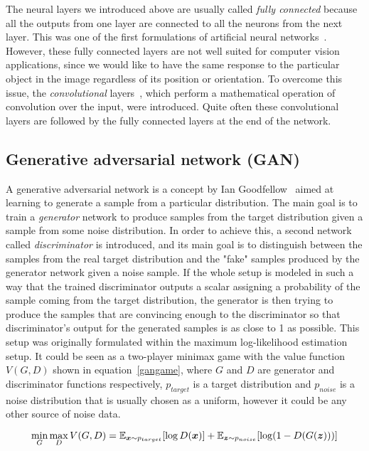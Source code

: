 The neural layers we introduced above are usually called {\em fully connected} because all the outputs from one layer are connected to all the neurons from the next layer. This was one of the first formulations of artificial neural networks~\cite{orignet}. However, these fully connected layers are not well suited for computer vision applications, since we would like to have the same response to the particular object in the image regardless of its position or orientation. To overcome this issue, the {\em convolutional} layers~\cite{convnet}, which perform a mathematical operation of convolution over the input, were introduced. Quite often these convolutional layers are followed by the fully connected layers at the end of the network.

\subsection{Generative adversarial network (GAN)}

A generative adversarial network is a concept by Ian Goodfellow~\cite{origgan} aimed at learning to generate a sample from a particular distribution. The main goal is to train a {\em generator} network to produce samples from the target distribution given a sample from some noise distribution. In order to achieve this, a second network called {\em discriminator} is introduced, and its main goal is to distinguish between the samples from the real target distribution and the "fake" samples produced by the generator network given a noise sample. If the whole setup is modeled in such a way that the trained discriminator outputs a scalar assigning a probability of the sample coming from the target distribution, the generator is then trying to produce the samples that are convincing enough to the discriminator so that discriminator's output for the generated samples is as close to 1 as possible. This setup was originally formulated within the maximum log-likelihood estimation setup. It could be seen as a two-player minimax game with the value function $V(G, D)$ shown in equation~\ref{gangame}, where $G$ and $D$ are generator and discriminator functions respectively, $p_{target}$ is a target distribution and $p_{noise}$ is a noise distribution that is usually chosen as a uniform, however it could be any other source of noise data.

\begin{equation}
\min_G \max_D V(G, D) = \operatorname{\mathbb{E}}_{\bm{x}\sim p_{target}}[\log D(\bm{x})] + \operatorname{\mathbb{E}}_{\bm{z}\sim p_{noise}} [\log(1 - D(G(\bm{z})))]
\label{gangame}
\end{equation}


